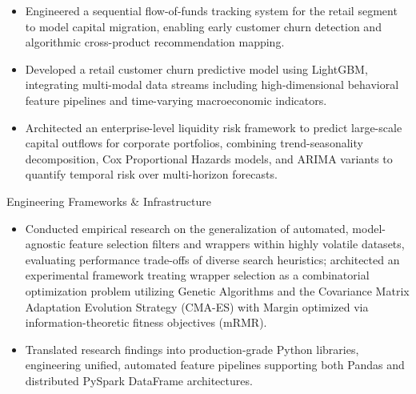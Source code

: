 \begin{cventries}
{\begin{cvitems}
\begin{itemize}
          \item[\(\cdot \)] {Engineered a sequential flow-of-funds tracking system for the retail segment to model capital migration, enabling early customer churn detection and algorithmic cross-product recommendation mapping.}
          \item[\(\cdot \)] {Developed a retail customer churn predictive model using LightGBM, integrating multi-modal data streams including high-dimensional behavioral feature pipelines and time-varying macroeconomic indicators.}
          \item[\(\cdot \)] {Architected an enterprise-level liquidity risk framework to predict large-scale capital outflows for corporate portfolios, combining trend-seasonality decomposition, Cox Proportional Hazards models, and ARIMA variants to quantify temporal risk over multi-horizon forecasts.}
        \end{itemize}
        \item{Engineering Frameworks \& Infrastructure}
        \begin{itemize}
          \item[\(\cdot \)] {Conducted empirical research on the generalization of automated, model-agnostic feature selection filters and wrappers within highly volatile datasets, evaluating performance trade-offs of diverse search heuristics; architected an experimental framework treating wrapper selection as a combinatorial optimization problem utilizing Genetic Algorithms and the Covariance Matrix Adaptation Evolution Strategy (CMA-ES) with Margin optimized via information-theoretic fitness objectives (mRMR).}
          \item[\(\cdot \)] {Translated research findings into production-grade Python libraries, engineering unified, automated feature pipelines supporting both Pandas and distributed PySpark DataFrame architectures.}
        \end{itemize} 

\end{cvitems}}
\end{cventries}
